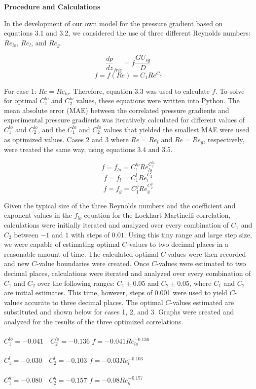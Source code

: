 \documentclass[10pt]{article}
\begin{document}
\textbf{Procedure and Calculations}

In the development of our own model for the pressure gradient based on equations 3.1 and 3.2, we considered the use of three different Reynolds numbers: \(Re_{lo}\), \(Re_l\), and \(Re_g\). 

\[\frac{dp}{dz}_{fric}=f\frac{GU_{sg}}{D}\]
\[f=f(Re)=C_1Re^{C_2}\]

For case 1: \(Re=Re_{lo}\). Therefore, equation 3.3 was used to calculate \(f\). To solve for optimal \(C_1^{lo}\) and \(C_2^{lo}\) values, these equations were written into Python. The mean absolute error (MAE) between the correlated pressure gradients and experimental pressure gradients was iteratively calculated for different values of \(C_1^{lo}\) and \(C_2^{lo}\), and the \(C_1^{lo}\) and \(C_2^{lo}\) values that yielded the smallest MAE were used as optimized values. Cases 2 and 3 where \(Re=Re_l\) and \(Re=Re_g\), respectively, were treated the same way, using equations 3.4 and 3.5.

\[f=f_{lo} = C_1^{lo}Re_{lo}^{C_2^{lo}}\]
\[f=f_l = C_1^lRe_l^{C_2^l}\]
\[f=f_g = C_1^gRe_g^{C_2^g}\]

Given the typical size of the three Reynolds numbers and the coefficient and exponent values in the \(f_{lo}\) equation for the Lockhart Martinelli correlation, calculations were initially iterated and analyzed over every combination of \(C_1\) and \(C_2\) between \(-1\) and \(1\) with steps of \(0.01\). Using this tiny range and large step size, we were capable of estimating optimal \(C\)-values to two decimal places in a reasonable amount of time. The calculated optimal \(C\)-values were then recorded and new \(C\)-value boundaries were created. Once \(C\)-values were estimated to two decimal places, calculations were iterated and analyzed over every combination of \(C_1\) and \(C_2\) over the following ranges: \(C_1\pm 0.05\) and \(C_2\pm 0.05\), where \(C_1\) and \(C_2\) are initial estimates. This time, however, steps of 0.001 were used to yield \(C\)-values accurate to three decimal places. The optimal \(C\)-values estimated are substituted and shown below for cases 1, 2, and 3. Graphs were created and analyzed for the results of the three optimized correlations.\\
\\
\(C_1^{lo}=-0.041\quad C_2^{lo}=-0.136\) \dotfill \(f=-0.041Re_{lo}^{-0.136}\)\\
\\
\(C_1^{l}=-0.030\quad C_2^{l}=-0.103\) \dotfill \(f=-0.03Re_{l}^{-0.103}\)\\
\\
\(C_1^{g}=-0.080\quad C_2^{g}=-0.157\) \dotfill \(f=-0.08Re_{g}^{-0.157}\)\\
\end{document}
